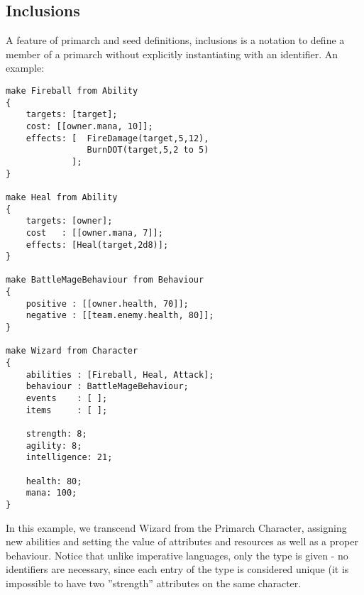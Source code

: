 \subsection{Inclusions}
A feature of primarch and seed definitions, inclusions  is a notation to define a member of a primarch without explicitly instantiating with an identifier. An example:
\begin{lstlisting}[language=fflang]
make Fireball from Ability
{
	targets: [target];
	cost: [[owner.mana, 10]];
	effects: [	FireDamage(target,5,12),
				BurnDOT(target,5,2 to 5)
			 ];
}

make Heal from Ability
{
	targets: [owner];
	cost   : [[owner.mana, 7]];
	effects: [Heal(target,2d8)];
}

make BattleMageBehaviour from Behaviour
{
	positive : [[owner.health, 70]];
	negative : [[team.enemy.health, 80]];
}

make Wizard from Character
{
	abilities : [Fireball, Heal, Attack];
	behaviour : BattleMageBehaviour;
	events    : [ ];
	items     : [ ];
                 
    strength: 8;
    agility: 8;
    intelligence: 21;
    
    health: 80;
    mana: 100;
}
\end{lstlisting}

In this example, we transcend Wizard from the Primarch Character, assigning new abilities and setting the value of attributes and resources as well as a proper behaviour. Notice that unlike imperative languages, only the type is given - no identifiers are necessary, since each entry of the type is considered unique (it is impossible to have two ''strength'' attributes on the same character.